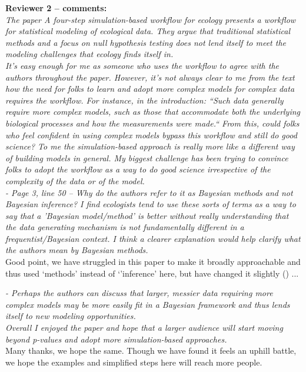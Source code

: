 \documentclass[11pt,a4paper]{article}
\begin{document}
{\bf Reviewer 2 -- comments:} \\

\emph{The paper A four-step simulation-based workflow for ecology presents a workflow for statistical modeling of ecological data. They argue that traditional statistical methods and a focus on null hypothesis testing does not lend itself to meet the modeling challenges that ecology finds itself in.}\\

\emph{It's easy enough for me as someone who uses the workflow to agree with the authors throughout the paper. However, it's not always clear to me from the text how the need for folks to learn and adopt more complex models for complex data requires the workflow. For instance, in the introduction: ``Such data generally require more complex models, such as those that accommodate both the underlying biological processes and how the measurements were made.`` From this, could folks who feel confident in using complex models bypass this workflow and still do good science? To me the simulation-based approach is really more like a different way of building models in general. My biggest challenge has been trying to convince folks to adopt the workflow as a way to do good science irrespective of the complexity of the data or of the model.}\\


\emph{- Page 3, line 50 -- Why do the authors refer to it as Bayesian methods and not Bayesian inference? I find ecologists tend to use these sorts of terms as a way to say that a 'Bayesian model/method' is better without really understanding that the data generating mechanism is not fundamentally different in a frequentist/Bayesian context. I think a clearer explanation would help clarify what the authors mean by Bayesian methods.}\\

Good point, we have struggled in this paper to make it broadly approachable and thus used `methods' instead of `'inference' here, but have changed it slightly () ... %

\emph{- Perhaps the authors can discuss that larger, messier data requiring more complex models may be more easily fit in a Bayesian framework and thus lends itself to new modeling opportunities.}\\


\emph{Overall I enjoyed the paper and hope that a larger audience will start moving beyond p-values and adopt more simulation-based approaches.}\\

Many thanks, we hope the same. Though we have found it feels an uphill battle, we hope the examples and simplified steps here will reach more people.\\



\end{document}

